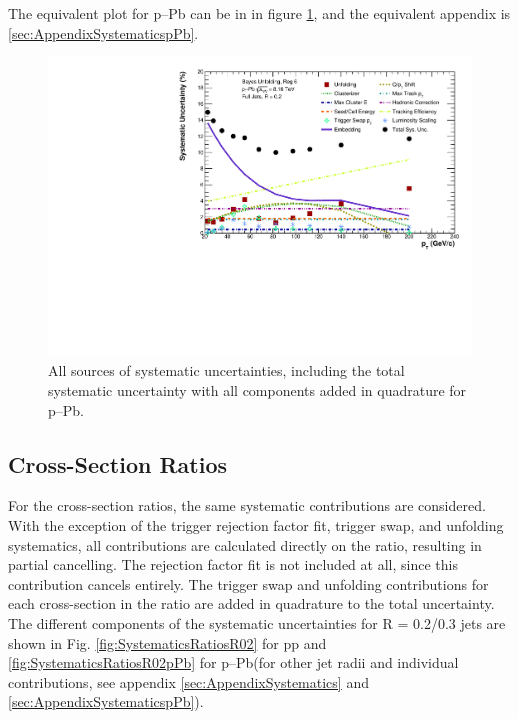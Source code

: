 \documentclass[ALICE]{ALICE_analysis_notes}
\newcommand{\pPb}{{\mbox{p--Pb}}\xspace}
\newcommand{\pp}{pp\xspace}
\begin{document}
The equivalent plot for \pPb can be in in figure \ref{fig:SystematicsSpectraR02pPb}, and the equivalent appendix is \ref{sec:AppendixSystematicspPb}.

\begin{figure}
    \centering
    \includegraphics[width=15cm]{figures/pPbFigures/Systematics/TotalSystematics_R02.pdf}
    \caption{All sources of systematic uncertainties, including the total systematic uncertainty with all components added in quadrature for \pPb.}
    \label{fig:SystematicsSpectraR02pPb}
\end{figure}

\subsection{Cross-Section Ratios}
\label{sec:SystematicsRatios}

For the cross-section ratios, the same systematic contributions are considered. With the exception of the trigger rejection factor fit, trigger swap, and unfolding systematics, all contributions are calculated directly on the ratio, resulting in partial cancelling. The rejection factor fit is not included at all, since this contribution cancels entirely. The trigger swap and unfolding contributions for each cross-section in the ratio are added in quadrature to the total uncertainty. The different components of the systematic uncertainties for R = 0.2/0.3 jets are shown in Fig. \ref{fig:SystematicsRatiosR02} for \pp and \ref{fig:SystematicsRatiosR02pPb} for \pPb (for other jet radii and individual contributions, see appendix \ref{sec:AppendixSystematics} and \ref{sec:AppendixSystematicspPb}).
\end{document}

